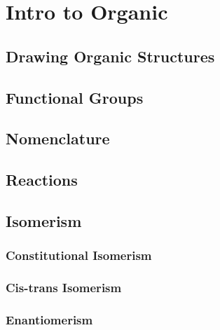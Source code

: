 \documentclass[../main]{subfiles}
\begin{document}
\section{Intro to Organic}

\subsection{Drawing Organic Structures}

\subsection{Functional Groups}

\subsection{Nomenclature}

\subsection{Reactions}

\subsection{Isomerism}

\subsubsection{Constitutional Isomerism}

\subsubsection{Cis-trans Isomerism}

\subsubsection{Enantiomerism}
\end{document}
